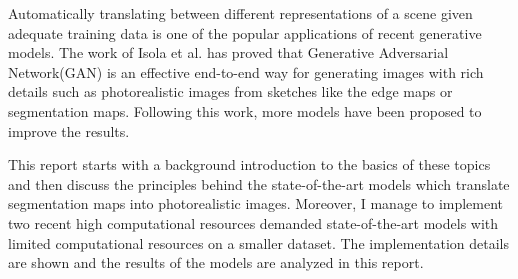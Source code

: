 Automatically translating between different representations of a scene given 
adequate training data 
is one of the popular applications of recent generative models. 
The work of Isola et al.\cite{pix2pix2016} has proved that 
Generative Adversarial Network(GAN) is an effective end-to-end way for generating images 
with rich details such as photorealistic images from sketches like the edge maps or segmentation maps. 
Following this work, more models have been proposed to improve the results. 

This report starts with a background introduction to the basics of these topics
and then discuss the principles behind the state-of-the-art models 
which translate segmentation maps into photorealistic images. 
Moreover, I manage to implement two recent high computational resources demanded 
state-of-the-art models with limited computational resources on a smaller dataset. 
The implementation details are shown and 
the results of the models are analyzed in this report.



